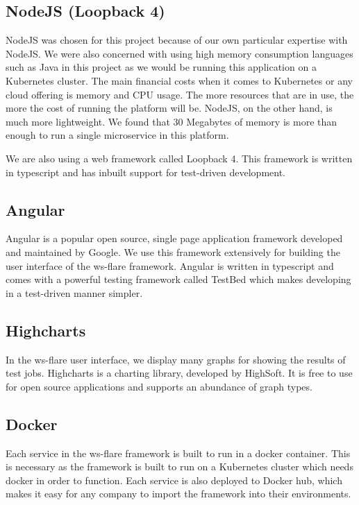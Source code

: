 \subsection{NodeJS (Loopback 4)}

NodeJS was chosen for this project because of our own particular expertise with NodeJS. We were also concerned with using high memory consumption languages such as Java in this project as we would be running this application on a Kubernetes cluster. The main financial costs when it comes to Kubernetes or any cloud offering is memory and CPU usage. The more resources that are in use, the more the cost of running the platform will be. NodeJS, on the other hand, is much more lightweight. We found that 30 Megabytes of memory is more than enough to run a single microservice in this platform. 

We are also using a web framework called Loopback 4. This framework is written in typescript and has inbuilt support for test-driven development.

\subsection{Angular}

Angular is a popular open source, single page application framework developed and maintained by Google. We use this framework extensively for building the user interface of the ws-flare framework. Angular is written in typescript and comes with a powerful testing framework called TestBed which makes developing in a test-driven manner simpler.

\subsection{Highcharts}

In the ws-flare user interface, we display many graphs for showing the results of test jobs. Highcharts is a charting library, developed by HighSoft. It is free to use for open source applications and supports an abundance of graph types.

\subsection{Docker}

Each service in the ws-flare framework is built to run in a docker container. This is necessary as the framework is built to run on a Kubernetes cluster which needs docker in order to function. Each service is also deployed to Docker hub, which makes it easy for any company to import the framework into their environments.

